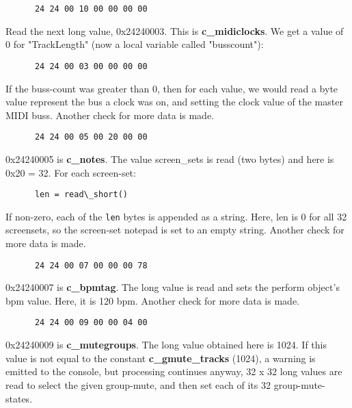    \begin{verbatim}
      24 24 00 10 00 00 00 00
   \end{verbatim}

   Read the next long value, 0x24240003.  This is \textbf{c\_midiclocks}.
   We get a value of 0 for "TrackLength" (now a local variable called
   "busscount"):

   \begin{verbatim}
      24 24 00 03 00 00 00 00
   \end{verbatim}

   If the buss-count was greater than 0, then for each value, we would read a
   byte value represent the bus a clock was on, and setting the clock value
   of the master MIDI buss.
   Another check for more data is made.

   \begin{verbatim}
      24 24 00 05 00 20 00 00
   \end{verbatim}

   0x24240005 is \textbf{c\_notes}.  The value screen\_sets is read (two
   bytes) and
   here is 0x20 = 32.  For each screen-set:

   \begin{verbatim}
      len = read\_short()
   \end{verbatim}

   If non-zero, each of the \texttt{len} bytes is appended as a string.
   Here, len is 0 for all 32 screensets, so the screen-set notepad is set to
   an empty string.
   Another check for more data is made.

   \begin{verbatim}
      24 24 00 07 00 00 00 78
   \end{verbatim}

   0x24240007 is \textbf{c\_bpmtag}.  The long value is read and sets the
   perform object's bpm value.  Here, it is 120 bpm.
   Another check for more data is made.

   \begin{verbatim}
      24 24 00 09 00 00 04 00
   \end{verbatim}

   0x24240009 is \textbf{c\_mutegroups}.  The long value obtained here is
   1024.  If this value is not equal to the constant
   \textbf{c\_gmute\_tracks} (1024), a warning is emitted to the console,
   but processing continues anyway, 32 x 32 long values are read to select
   the given group-mute, and then set each of its 32 group-mute-states.


